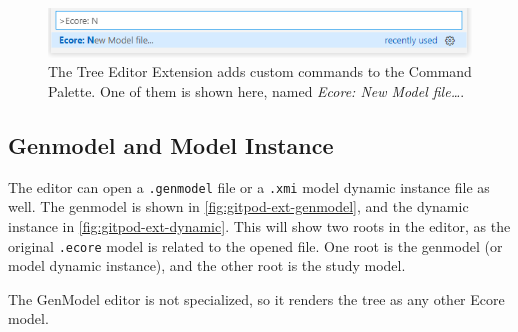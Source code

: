 \begin{figure}[H]  %
  \centering
  \includegraphics[width=\textwidth]{figures/gitpod-vscode-newmodel.png}
  \caption[Tree Editor Extension Custom Commands]{The Tree Editor Extension adds custom commands to the Command Palette. One of them is shown here, named \textit{Ecore: New Model file\ldots}.}\label{fig:gitpod-ext-newmodel}
\end{figure}

\subsection{Genmodel and Model Instance}

The editor can open a \texttt{.genmodel} file or a \texttt{.xmi} model dynamic instance file as well.
The genmodel is shown in \cref{fig:gitpod-ext-genmodel}, and the dynamic instance in \cref{fig:gitpod-ext-dynamic}.
This will show two roots in the editor, as the original \texttt{.ecore} model is related to the opened file.
One root is the genmodel (or model dynamic instance), and the other root is the study model.

The GenModel editor is not specialized, so it renders the tree as any other \gls{Ecore} model.

